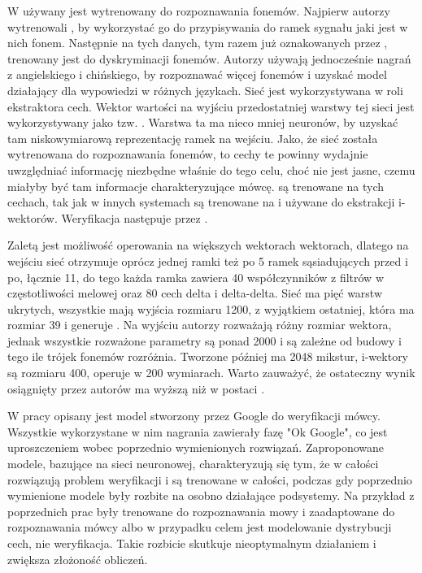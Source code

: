 W \cite{investigationOfBottleneck}
używany jest  wytrenowany do rozpoznawania fonemów. Najpierw autorzy wytrenowali
, by wykorzystać go do przypisywania do ramek sygnału jaki
jest w nich fonem. Następnie na tych danych, tym razem już oznakowanych przez ,
trenowany jest  do dyskryminacji fonemów. Autorzy używają
jednocześnie nagrań z angielskiego i chińskiego, by rozpoznawać więcej fonemów i uzyskać model działający
dla wypowiedzi w różnych językach.
Sieć jest wykorzystywana w roli ekstraktora cech. Wektor wartości na wyjściu przedostatniej warstwy
tej sieci jest wykorzystywany jako tzw. .
Warstwa ta ma nieco mniej neuronów, by uzyskać tam niskowymiarową reprezentację ramek na wejściu.
Jako, że sieć została wytrenowana do rozpoznawania fonemów, to cechy te powinny
wydajnie uwzględniać informację niezbędne właśnie do tego celu, choć nie jest jasne, czemu miałyby być
tam informacje charakteryzujące mówcę.
 są trenowane na tych cechach, tak jak w innych systemach są trenowane na 
i używane do ekstrakcji i-wektorów. Weryfikacja następuje przez .

Zaletą  jest możliwość operowania na większych wektorach wektorach, dlatego na wejściu sieć otrzymuje
oprócz jednej ramki też po 5 ramek sąsiadujących przed i po, łącznie 11,
do tego każda ramka zawiera 40 współczynników z filtrów w częstotliwości melowej oraz 80 cech delta i delta-delta.
Sieć ma pięć warstw ukrytych, wszystkie mają wyjścia rozmiaru 1200, z wyjątkiem
ostatniej, która ma rozmiar 39 i generuje . Na wyjściu autorzy rozważają
różny rozmiar wektora, jednak wszystkie rozważone parametry są ponad 2000 i są zależne
od budowy  i tego ile trójek fonemów rozróżnia. Tworzone później
 ma 2048 mikstur, i-wektory są rozmiaru 400,  operuje w 200 wymiarach.
Warto zauważyć, że ostateczny wynik osiągnięty przez autorów ma wyższą  niż 
w postaci .

W pracy \cite{endToEnd}
opisany jest model stworzony przez Google do weryfikacji mówcy. Wszystkie wykorzystane
w nim nagrania zawierały fazę "Ok Google", co jest uproszczeniem wobec poprzednio wymienionych rozwiązań.
Zaproponowane modele, bazujące na sieci neuronowej, charakteryzują się tym, że w całości rozwiązują problem weryfikacji
i są trenowane w całości, podczas gdy poprzednio wymienione modele były rozbite na osobno działające podsystemy.
Na przykład  z poprzednich prac były trenowane do rozpoznawania mowy i zaadaptowane do rozpoznawania
mówcy albo w przypadku  celem jest modelowanie dystrybucji cech, nie weryfikacja. Takie rozbicie
skutkuje nieoptymalnym działaniem i zwiększa złożoność obliczeń.

